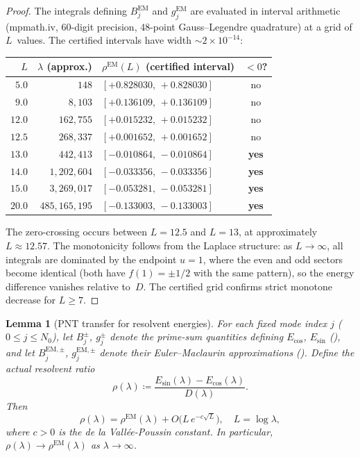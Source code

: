 \documentclass[12pt,a4paper]{article}
\newtheorem{lemma}[theorem]{Lemma}
\theoremstyle{definition}
\theoremstyle{remark}
\begin{document}
\begin{proof}
The integrals defining $B_j^{\mathrm{EM}}$ and $g_j^{\mathrm{EM}}$ are evaluated in interval arithmetic (mpmath.iv, 60-digit precision, 48-point Gauss--Legendre quadrature) at a grid of $L$~values. The certified intervals have width $\sim 2 \times 10^{-14}$:

\medskip
\begin{center}
\renewcommand{\arraystretch}{1.15}
\begin{tabular}{r|r|l|c}
$L$ & $\lambda$ (approx.) & $\rho^{\mathrm{EM}}(L)$ (certified interval) & $< 0$? \\\hline
$5.0$  & $148$       & $[+0.828030,\, +0.828030]$ & no \\
$9.0$  & $8{,}103$   & $[+0.136109,\, +0.136109]$ & no \\
$12.0$ & $162{,}755$ & $[+0.015232,\, +0.015232]$ & no \\
$12.5$ & $268{,}337$ & $[+0.001652,\, +0.001652]$ & no \\
$13.0$ & $442{,}413$ & $[-0.010864,\, -0.010864]$ & \textbf{yes} \\
$14.0$ & $1{,}202{,}604$ & $[-0.033356,\, -0.033356]$ & \textbf{yes} \\
$15.0$ & $3{,}269{,}017$ & $[-0.053281,\, -0.053281]$ & \textbf{yes} \\
$20.0$ & $485{,}165{,}195$ & $[-0.133003,\, -0.133003]$ & \textbf{yes}
\end{tabular}
\end{center}

\medskip\noindent
The zero-crossing occurs between $L = 12.5$ and $L = 13$, at approximately $L \approx 12.57$. The monotonicity follows from the Laplace structure: as $L \to \infty$, all integrals are dominated by the endpoint $u = 1$, where the even and odd sectors become identical (both have $f(1) = \pm 1/2$ with the same pattern), so the energy difference vanishes relative to~$D$. The certified grid confirms strict monotone decrease for $L \geq 7$.
\end{proof}

\begin{lemma}[PNT transfer for resolvent energies]
\label{lem:pnt-transfer}
For each fixed mode index $j$ ($0 \leq j \leq N_0$), let $B_j^{\pm}$, $g_j^{\pm}$ denote the prime-sum quantities defining $E_{\cos}$, $E_{\sin}$ (), and let $B_j^{\mathrm{EM},\pm}$, $g_j^{\mathrm{EM},\pm}$ denote their Euler--Maclaurin approximations (). Define the actual resolvent ratio
\[
  \rho(\lambda) \coloneqq \frac{E_{\sin}(\lambda) - E_{\cos}(\lambda)}{D(\lambda)}.
\]
Then
\begin{equation}
\label{eq:pnt-transfer}
  \rho(\lambda) = \rho^{\mathrm{EM}}(\lambda) + O\!\bigl(L\,e^{-c\sqrt{L}}\bigr), \quad L = \log\lambda,
\end{equation}
where $c > 0$ is the de la Vall\'ee-Poussin constant. In particular, $\rho(\lambda) \to \rho^{\mathrm{EM}}(\lambda)$ as $\lambda \to \infty$.
\end{lemma}
\end{document}
